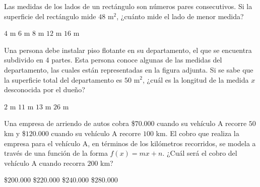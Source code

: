 \documentclass[
  titulo=Tarea,
  subtitulo=Álgebra y funciones,
  curso=Tercero medio,
  con nombre,
]{srs3}
\begin{document}
\begin{preguntas}
\pregunta Las medidas de los lados de un rectángulo son números pares consecutivos. Si la superficie del rectángulo mide \(48\) m\(^2\), ¿cuánto mide el lado de menor medida?
\begin{alternativas}
\alternativa \(4\) m
\alternativa \(6\) m
\alternativa \(8\) m
\alternativa \(12\) m
\alternativa \(16\) m
\end{alternativas}

\pregunta Una persona debe instalar piso flotante en su departamento, el que se encuentra subdivido en 4 partes. Esta persona conoce algunas de las medidas del departamento, las cuales están representadas en la figura adjunta. Si se sabe que la superficie total del departamento es \(50\) m\(^2\), ¿cuál es la longitud de la medida \(x\) desconocida por el dueño?
\begin{columnas}[0.4][t]
\begin{alternativas}
\alternativa \(2\) m
\alternativa \(11\) m
\alternativa \(13\) m
\alternativa \(26\) m
\end{alternativas}
\siguiente
{}
\end{columnas}

\pregunta Una empresa de arriendo de autos cobra \$$70.000$ cuando su vehículo A recorre \(50\) km y \$$120.000$ cuando su vehículo A recorre \(100\) km. El cobro que realiza la empresa para el vehículo A, en términos de los kilómetros recorridos, se modela a través de una función de la forma \(f\left(x\right)=mx+n\). ¿Cuál será el cobro del vehículo A cuando recorra \(200\) km?
\begin{alternativas}
\alternativa \$$200.000$
\alternativa \$$220.000$
\alternativa \$$240.000$
\alternativa \$$280.000$
\end{alternativas}


\end{preguntas}
\end{document}
